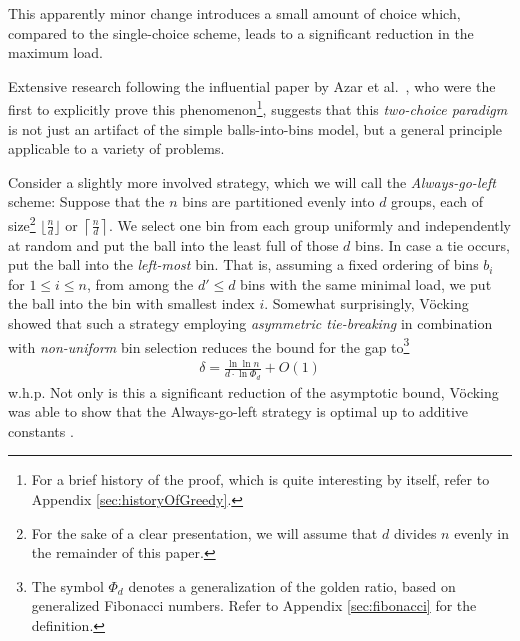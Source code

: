 \documentclass[a4paper,12pt]{article}
\begin{document}
This apparently minor change introduces a small amount of choice which, compared to the single-choice scheme, leads to a significant reduction in the maximum load. 
\begin{comment}
Curiously, the exponential decrease in the gap is already achieved having just two choices (that is, $d=2$). Each additional choice decreases the bound for the maximum gap by just a constant factor~\cite{MRS01}. 
\end{comment}
Extensive research following the influential paper by Azar et al.~\cite{ABKU99}, who were the first to explicitly prove this phenomenon\footnote{For a brief history of the proof, which is quite interesting by itself, refer to Appendix \ref{sec:historyOfGreedy}.}, suggests that this \emph{two-choice paradigm} is not just an artifact of the simple balls-into-bins model, but a general principle applicable to a variety of problems. 

Consider a slightly more involved strategy, which we will call the \emph{Always-go-left} scheme: Suppose that the $n$ bins are partitioned evenly into $d$ groups, each of size\footnote{For the sake of a clear presentation, we will assume that $d$ divides $n$ evenly in the remainder of this paper.} $\lfloor \frac{n}{d}\rfloor$ or $\left\lceil\frac{n}{d}\right\rceil$. We select one bin from each group uniformly and independently at random and put the ball into the least full of those $d$ bins. In case a tie occurs, put the ball into the \emph{left-most} bin. That is, assuming a fixed ordering of bins $b_i$ for $1 \leq i \leq n$, from among the $d' \leq d$ bins with the same minimal load, we put the ball into the bin with smallest index $i$. Somewhat surprisingly, V\"ocking \cite{VOC03} showed that such a strategy employing \emph{asymmetric tie-breaking} in combination with \emph{non-uniform} bin selection reduces the bound for the gap to\footnote{The symbol $\Phi_d$ denotes a generalization of the golden ratio, based on generalized Fibonacci numbers. Refer to Appendix \ref{sec:fibonacci} for the definition.}
\begin{align*}
\delta = \frac{\ln\ln n}{d \cdot \ln \Phi_d} + O(1)
\end{align*}
w.h.p. Not only is this a significant reduction of the asymptotic bound, V\"ocking was able to show that the Always-go-left strategy is optimal up to additive constants \cite{VOC03}.
\end{document}
